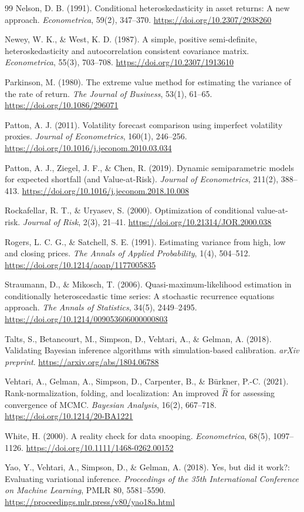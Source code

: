 \documentclass[12pt,a4paper]{article}
\theoremstyle{definition}
\theoremstyle{remark}
\begin{document}
\begin{thebibliography}{99}
 Nelson, D. B. (1991). Conditional heteroskedasticity in asset returns: A new approach. \emph{Econometrica}, 59(2), 347--370. \url{https://doi.org/10.2307/2938260}

 Newey, W. K., \& West, K. D. (1987). A simple, positive semi-definite, heteroskedasticity and autocorrelation consistent covariance matrix. \emph{Econometrica}, 55(3), 703--708. \url{https://doi.org/10.2307/1913610}

 Parkinson, M. (1980). The extreme value method for estimating the variance of the rate of return. \emph{The Journal of Business}, 53(1), 61--65. \url{https://doi.org/10.1086/296071}

 Patton, A. J. (2011). Volatility forecast comparison using imperfect volatility proxies. \emph{Journal of Econometrics}, 160(1), 246--256. \url{https://doi.org/10.1016/j.jeconom.2010.03.034}

 Patton, A. J., Ziegel, J. F., \& Chen, R. (2019). Dynamic semiparametric models for expected shortfall (and Value-at-Risk). \emph{Journal of Econometrics}, 211(2), 388--413. \url{https://doi.org/10.1016/j.jeconom.2018.10.008}

 Rockafellar, R. T., \& Uryasev, S. (2000). Optimization of conditional value-at-risk. \emph{Journal of Risk}, 2(3), 21--41. \url{https://doi.org/10.21314/JOR.2000.038}

 Rogers, L. C. G., \& Satchell, S. E. (1991). Estimating variance from high, low and closing prices. \emph{The Annals of Applied Probability}, 1(4), 504--512. \url{https://doi.org/10.1214/aoap/1177005835}

 Straumann, D., \& Mikosch, T. (2006). Quasi-maximum-likelihood estimation in conditionally heteroscedastic time series: A stochastic recurrence equations approach. \emph{The Annals of Statistics}, 34(5), 2449--2495. \url{https://doi.org/10.1214/009053606000000803}

 Talts, S., Betancourt, M., Simpson, D., Vehtari, A., \& Gelman, A. (2018). Validating Bayesian inference algorithms with simulation-based calibration. \emph{arXiv preprint}. \url{https://arxiv.org/abs/1804.06788}

 Vehtari, A., Gelman, A., Simpson, D., Carpenter, B., \& Bürkner, P.-C. (2021). Rank-normalization, folding, and localization: An improved $\widehat R$ for assessing convergence of MCMC. \emph{Bayesian Analysis}, 16(2), 667--718. \url{https://doi.org/10.1214/20-BA1221}

 White, H. (2000). A reality check for data snooping. \emph{Econometrica}, 68(5), 1097--1126. \url{https://doi.org/10.1111/1468-0262.00152}

 Yao, Y., Vehtari, A., Simpson, D., \& Gelman, A. (2018). Yes, but did it work?: Evaluating variational inference. \emph{Proceedings of the 35th International Conference on Machine Learning}, PMLR 80, 5581--5590. \url{https://proceedings.mlr.press/v80/yao18a.html}

\end{thebibliography}
\end{document}

